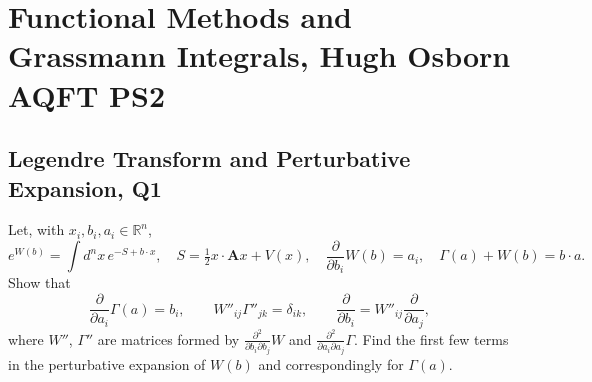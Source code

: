 \section{Functional Methods and Grassmann Integrals, Hugh Osborn AQFT PS2}


\subsection{Legendre Transform and Perturbative Expansion, Q1}

Let, with $x_i, b_i, a_i \in \mathbb{R}^n$,
\begin{equation}
    e^{W(b)} = \int d^n x\, e^{-S + b\cdot x}, \quad S = \tfrac{1}{2}x\cdot\mathbf{A} x + V(x), \quad \frac{\partial}{\partial b_i}W(b) = a_i, \quad \Gamma(a) + W(b) = b\cdot a.
\end{equation}
Show that
\begin{equation}
    \frac{\partial}{\partial a_i}\Gamma(a) = b_i, \qquad W''_{ij}{\Gamma}''_{jk} = \delta_{ik}, \qquad \frac{\partial}{\partial b_i} = W''_{ij}\frac{\partial}{\partial a_j},
\end{equation}
where $W''$, $\Gamma''$ are matrices formed by $\frac{\partial^2}{\partial b_i\partial b_j}W$ and $\frac{\partial^2}{\partial a_i\partial a_j}\Gamma$. Find the first few terms in the perturbative expansion of $W(b)$ and correspondingly for $\Gamma(a)$.
